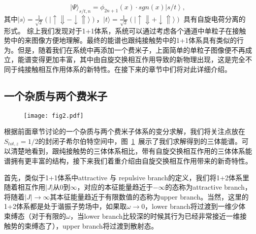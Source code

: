\begin{equation}
|\Psi\rangle_{s/t,n} = \phi_{2n+1}(x) \cdot sgn(x)\left| s/t \right>, \label{asymptotic_wf}
\end{equation}
其中$|s\rangle = \frac{1}{\sqrt{2}}(|\uparrow\Downarrow - \downarrow\Uparrow\rangle)$，$|t\rangle = \frac{1}{\sqrt{2}}(|\uparrow\Downarrow + \downarrow\Uparrow\rangle)$ 具有自旋电荷分离的形式。
综上我们发现对于1+1体系，系统可以通过考虑各个通道中单粒子在接触势中的来图像方便地理解。最终的能谱也跟纯接触势中的1+1体系\cite{busch1998two}具有类似的行为。但是，随着我们在系统中再添加一个费米子，上面简单的单粒子图像便不再成立，能谱变得更加丰富，其中由自旋交换相互作用导致的新物理出现，这是完全不同于纯接触相互作用体系的新特性。在接下来的章节中们将对此详细介绍。

\subsection{一个杂质与两个费米子}

\begin{figure}[!htbp]
    \centering
    \texttt{[image: fig2.pdf]}
    \label{fig:fig2}
\end{figure}
根据前面章节讨论的一个杂质与两个费米子体系的变分求解，我们将关注点放在$S_{tot,z}=1/2$的封闭子希尔伯特空间中，图~\ref{fig:fig2}~展示了我们求解得到的三体能谱。可以清楚地看到，跟纯接触势的三体体系相比，带有自旋交换相互作用的三体体系能谱拥有更丰富的结构，接下来我们着重介绍由自旋交换相互作用带来的新奇特性。

首先，类似于1+1体系中attractive 与 repulsive branch的定义，我们将1+2体系里随着相互作用$|J|$从$0$到$\infty$，对应的本征能量趋近于$-\infty$的态称为attractive branch，将随着$|J|\to\infty$其本征能量趋近于有限数值的态称为upper branch。当然，这里的1+2体系都是处于谐振子势场中，如果取$\omega\to 0$，lower branch将过渡到一维少体束缚态（对于有限的$\omega$，当lower branch比较深的时候其行为已经非常接近一维接触势的束缚态了），upper branch将过渡到散射态。

